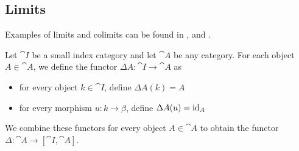 \subsection{Limits}\label{subsec:categorical_limits}

\begin{remark}\label{def:categorical_limit_examples}
  Examples of limits and colimits can be found in ,  and .
\end{remark}

\begin{definition}\label{def:diagonal_functor}\mcite\cite[143]{Leinster2014}
  Let \( \cat{I} \) be a small index category and let \( \cat{A} \) be any category. For each object \( A \in \cat{A} \), we define the functor \( \Delta A: \cat{I} \to \cat{A} \) as
  \begin{itemize}
    \item for every object \( k \in \cat{I} \), define \( \Delta A(k) = A \)
    \item for every morphism \( u: k \to \beta \), define \( \Delta A(u) = \operatorname{id}_A \)
  \end{itemize}

  We combine these functors for every object \( A \in \cat{A} \) to obtain the functor \( \Delta: \cat{A} \to [\cat{I}, \cat{A}] \).
\end{definition}

